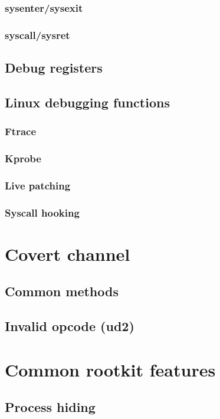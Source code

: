 \documentclass{article}
\begin{document}
\subsubsection{sysenter/sysexit}
\subsubsection{syscall/sysret}

\subsection{Debug registers}

\subsection{Linux debugging functions}
\subsubsection{Ftrace}
\subsubsection{Kprobe}
\subsubsection{Live patching}
\subsubsection{Syscall hooking}

\section{Covert channel}
\subsection{Common methods}
\subsection{Invalid opcode (ud2)}

\section{Common rootkit features}
\subsection{Process hiding}
\end{document}
